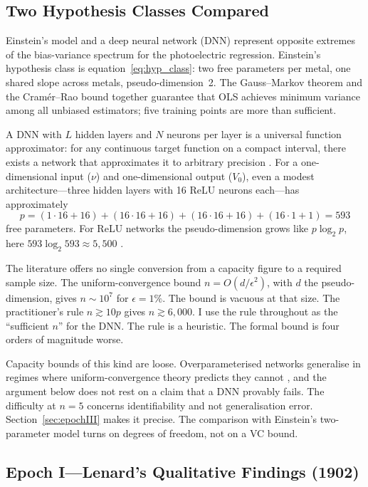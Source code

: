 \documentclass[12pt]{article}
\begin{document}
\subsection{Two Hypothesis Classes Compared}

Einstein's model and a deep neural network (DNN) represent opposite
extremes of the bias-variance spectrum for the photoelectric regression.
Einstein's hypothesis class is equation~\eqref{eq:hyp_class}: two free
parameters per metal, one shared slope across metals, pseudo-dimension~2.
The Gauss--Markov theorem and the Cram\'er--Rao bound together guarantee
that OLS achieves minimum variance among all unbiased estimators;
five training points are more than sufficient.

A DNN with $L$ hidden layers and $N$ neurons per layer is a universal
function approximator: for any continuous target function on a compact
interval, there exists a network that approximates it to arbitrary
precision \citep{Hornik1989}.  For a one-dimensional input ($\nu$) and
one-dimensional output ($V_0$), even a modest architecture---three
hidden layers with 16 ReLU neurons each---has approximately
\[
  p = (1\cdot16+16)+(16\cdot16+16)+(16\cdot16+16)+(16\cdot1+1)
    = 593
\]
free parameters.  For ReLU networks the pseudo-dimension grows like
$p\log_2 p$, here $593\log_2 593 \approx 5{,}500$ \citep{Vapnik1998}.

The literature offers no single conversion from a capacity figure to a
required sample size.  The uniform-convergence bound $n = O(d/\epsilon^2)$,
with $d$ the pseudo-dimension, gives $n \sim 10^7$ for $\epsilon = 1\%$.  The
bound is vacuous at that size.  The practitioner's rule $n \gtrsim 10p$ gives
$n \gtrsim 6{,}000$.  I use the rule throughout as the ``sufficient $n$'' for
the DNN.  The rule is a heuristic.  The formal bound is four orders of
magnitude worse.

Capacity bounds of this kind are loose.  Overparameterised networks generalise
in regimes where uniform-convergence theory predicts they cannot
\citep{Belkin2019}, and the argument below does not rest on a claim that a DNN
provably fails.  The difficulty at $n=5$ concerns identifiability and not
generalisation error.  Section~\ref{sec:epochIII} makes it precise.  The
comparison with Einstein's two-parameter model turns on degrees of freedom,
not on a VC bound.

\subsection{Epoch I---Lenard's Qualitative Findings (1902)}
\end{document}
